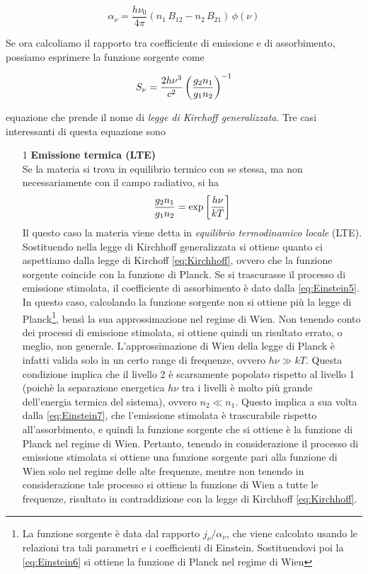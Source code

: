 \begin{EQ}
\begin{equation}
\alpha_\nu = \dfrac{h\nu_0}{4\pi} (n_1\,B_{12}-n_2\,B_{21})\,\phi(\nu) \label{eq:Einstein7}
\end{equation}
\end{EQ}
Se ora calcoliamo il rapporto tra coefficiente di emissione e di assorbimento, possiamo esprimere la funzione sorgente come
\begin{EQ}
\begin{equation}
S_\nu = \dfrac{2h\nu^3}{c^2}\left( \dfrac{g_2n_1}{g_1n_2} \right)^{-1}
\end{equation}
\end{EQ}
equazione che prende il nome di \textit{legge di Kirchoff generalizzata}. Tre casi interessanti di questa equazione sono
\begin{itemize}
\item[1]\textbf{Emissione termica (LTE)} \\
Se la materia si trova in equilibrio termico con se stessa, ma non necessariamente con il campo radiativo, si ha
\begin{equation}
\dfrac{g_2n_1}{g_1n_2} = \exp\left[ \dfrac{h\nu}{kT} \right] \label{eq:Einstein6}
\end{equation}
Il questo caso la materia viene detta in \textit{equilibrio termodinamico locale} (LTE).
Sostituendo nella legge di Kirchhoff generalizzata si ottiene quanto ci aspettiamo dalla legge di Kirchoff \ref{eq:Kirchhoff}, ovvero che la funzione sorgente coincide con la funzione di Planck. Se si trascurasse il processo di emissione stimolata, il coefficiente di assorbimento è dato dalla \ref{eq:Einstein5}. In questo caso, calcolando la funzione sorgente non si ottiene più la legge di Planck\footnote{La funzione sorgente è data dal rapporto $j_\nu/\alpha_\nu$, che viene calcolato usando le relazioni tra tali parametri e i coefficienti di Einstein. Sostituendovi poi la \ref{eq:Einstein6} si ottiene la funzione di Planck nel regime di Wien}, bensì la sua approssimazione nel regime di Wien. Non tenendo conto dei processi di emissione stimolata, si ottiene quindi un risultato errato, o meglio, non generale. L'approssimazione di Wien della legge di Planck è infatti valida solo in un certo range di frequenze, ovvero $h \nu \gg kT$. Questa condizione implica che il livello 2 è scarsamente popolato rispetto al livello 1 (poichè la separazione energetica $h\nu$ tra i livelli è molto più grande dell'energia termica del sistema), ovvero $n_2 \ll n_1$. Questo implica a sua volta dalla \ref{eq:Einstein7}, che l'emissione stimolata è trascurabile rispetto all'assorbimento, e quindi la funzione sorgente che si ottiene è la funzione di Planck nel regime di Wien. Pertanto, tenendo in considerazione il processo di emissione stimolata si ottiene una funzione sorgente pari alla funzione di Wien solo nel regime delle alte frequenze, mentre non tenendo in considerazione tale processo si ottiene la funzione di Wien a tutte le frequenze, risultato in contraddizione con la legge di Kirchhoff \ref{eq:Kirchhoff}.

\end{itemize}
